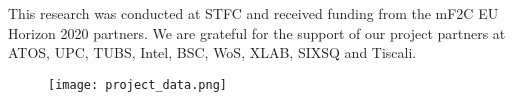 This research was conducted at STFC and received funding from the mF2C EU Horizon 2020 partners. We are grateful for the support of our project partners at ATOS, UPC, TUBS, Intel, BSC, WoS, XLAB, SIXSQ and Tiscali.

\begin{figure}[h]
  \centering
    \texttt{[image: project\_data.png]}
\end{figure}
